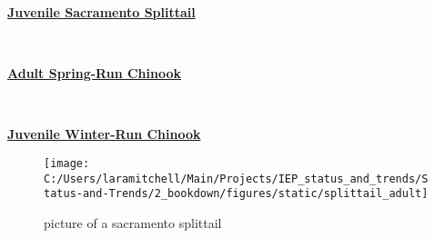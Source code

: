 \documentclass[
]{book}
\begin{document}
\begin{panel-grid}

\begin{columns-nocenter}

\begin{column800}

\textbf{\href{http://calfish.ucdavis.edu/species/?uid=136\&ds=698}{Juvenile Sacramento Splittail}}

\end{column800}

\begin{column40}

~

\end{column40}

\begin{column800}

\textbf{\href{http://calfish.ucdavis.edu/species/?uid=28\&ds=698}{Adult Spring-Run Chinook}}

\end{column800}

\begin{column40}

~

\end{column40}

\begin{column800}

\textbf{\href{http://calfish.ucdavis.edu/species/?uid=30\&ds=698}{Juvenile Winter-Run Chinook}}

\end{column800}

\end{columns-nocenter}

\begin{columns-nocenter}

\begin{column800}

\begin{figure}

{\centering \texttt{[image: C:/Users/laramitchell/Main/Projects/IEP\_status\_and\_trends/Status-and-Trends/2\_bookdown/figures/static/splittail\_adult]} 

}

\caption{picture of a sacramento splittail}\label{fig:unnamed-chunk-32}
\end{figure}

\end{column800}

\begin{column40}


\end{column40}
\end{columns-nocenter}
\end{panel-grid}
\end{document}
